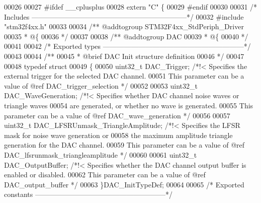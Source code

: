 \begin{DoxyCode}
00026 
00027 \textcolor{preprocessor}{#}\textcolor{preprocessor}{ifdef} \_\_cplusplus
00028  \textcolor{keyword}{extern} \textcolor{stringliteral}{"C"} \{
00029 \textcolor{preprocessor}{#}\textcolor{preprocessor}{endif}
00030 
00031 \textcolor{comment}{/* Includes ------------------------------------------------------------------*/}
00032 \textcolor{preprocessor}{#}\textcolor{preprocessor}{include} "stm32f4xx.h"
00033 
00034 \textcolor{comment}{/** @addtogroup STM32F4xx\_StdPeriph\_Driver}
00035 \textcolor{comment}{  * @\{}
00036 \textcolor{comment}{  */}
00037 
00038 \textcolor{comment}{/** @addtogroup DAC}
00039 \textcolor{comment}{  * @\{}
00040 \textcolor{comment}{  */}
00041 
00042 \textcolor{comment}{/* Exported types ------------------------------------------------------------*/}
00043 
00044 \textcolor{comment}{/** }
00045 \textcolor{comment}{  * @brief  DAC Init structure definition}
00046 \textcolor{comment}{  */}
00047 
00048 \textcolor{keyword}{typedef} \textcolor{keyword}{struct}
00049 \{
00050   uint32\_t DAC_Trigger;                      \textcolor{comment}{/*!< Specifies the external trigger for the selected DAC
       channel.}
00051 \textcolor{comment}{                                                  This parameter can be a value of @ref
       DAC\_trigger\_selection */}
00052 
00053   uint32\_t DAC_WaveGeneration;               \textcolor{comment}{/*!< Specifies whether DAC channel noise waves or
       triangle waves}
00054 \textcolor{comment}{                                                  are generated, or whether no wave is generated.}
00055 \textcolor{comment}{                                                  This parameter can be a value of @ref
       DAC\_wave\_generation */}
00056 
00057   uint32\_t DAC_LFSRUnmask_TriangleAmplitude; \textcolor{comment}{/*!< Specifies the LFSR mask for noise wave generation or}
00058 \textcolor{comment}{                                                  the maximum amplitude triangle generation for the
       DAC channel. }
00059 \textcolor{comment}{                                                  This parameter can be a value of @ref
       DAC\_lfsrunmask\_triangleamplitude */}
00060 
00061   uint32\_t DAC_OutputBuffer;                 \textcolor{comment}{/*!< Specifies whether the DAC channel output buffer is
       enabled or disabled.}
00062 \textcolor{comment}{                                                  This parameter can be a value of @ref
       DAC\_output\_buffer */}
00063 \}DAC\_InitTypeDef;
00064 
00065 \textcolor{comment}{/* Exported constants --------------------------------------------------------*/}

\end{DoxyCode}
